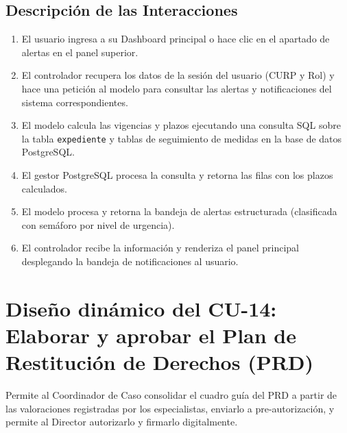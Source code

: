 \subsection{Descripción de las Interacciones}
\begin{enumerate}
    \item El usuario ingresa a su Dashboard principal o hace clic en el apartado de alertas en el panel superior.
    \item El controlador recupera los datos de la sesión del usuario (CURP y Rol) y hace una petición al modelo para consultar las alertas y notificaciones del sistema correspondientes.
    \item El modelo calcula las vigencias y plazos ejecutando una consulta SQL sobre la tabla \texttt{expediente} y tablas de seguimiento de medidas en la base de datos PostgreSQL.
    \item El gestor PostgreSQL procesa la consulta y retorna las filas con los plazos calculados.
    \item El modelo procesa y retorna la bandeja de alertas estructurada (clasificada con semáforo por nivel de urgencia).
    \item El controlador recibe la información y renderiza el panel principal desplegando la bandeja de notificaciones al usuario.
\end{enumerate}



\cleardoublepage
\section{Diseño dinámico del CU-14: Elaborar y aprobar el Plan de Restitución de Derechos (PRD)}
\label{sec:disenoDinamicoCU14}

Permite al Coordinador de Caso consolidar el cuadro guía del PRD a partir de las valoraciones registradas por los especialistas, enviarlo a pre-autorización, y permite al Director autorizarlo y firmarlo digitalmente.

